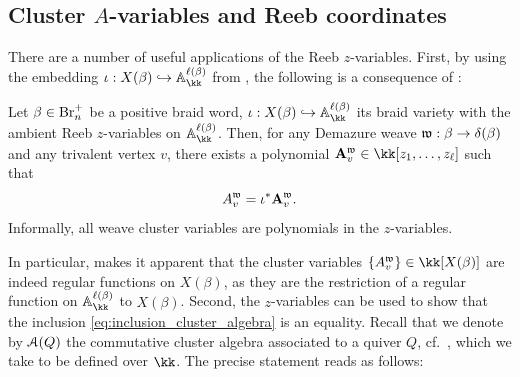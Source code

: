 \subsection{Cluster $A$-variables and Reeb coordinates}\label{ssec:polynomiality_A_variables_Reeb_coordinates}
There are a number of useful applications of the Reeb $z$-variables. First, by using the embedding $\iota:X(\beta)\hookrightarrow\mathbb{A}_\kk^{\ell(\beta)}$ from , the following is a consequence of \cite[Theorem 7.6]{CGGLSS25}:

\begin{theorem}\label{thm:polynomiality} Let $\beta\in\mbox{Br}_n^+$ be a positive braid word, $\iota:X(\beta)\hookrightarrow\mathbb{A}_\kk^{\ell(\beta)}$ its braid variety with the ambient Reeb $z$-variables on $\mathbb{A}_\kk^{\ell(\beta)}$. Then, for any Demazure weave $\mathfrak{w}:\beta\to\delta(\beta)$ and any trivalent vertex $v$, there exists a polynomial ${\bf A}^\w_v\in \kk[z_1,\ldots,z_\ell]$ such that
$$A^{\mathfrak{w}}_v=\iota^*{\bf A}^{\mathfrak{w}}_v.$$
Informally, all weave cluster variables are polynomials in the $z$-variables.\sbs
\end{theorem}

\noindent In particular,  makes it apparent that the cluster variables $\{A^\w_v\}\in\kk[X(\beta)]$ are indeed regular functions on $X(\beta)$, as they are the restriction of a regular function on $\mathbb{A}_\kk^{\ell(\beta)}$ to $X(\beta)$. Second, the $z$-variables can be used to show that the inclusion \eqref{eq:inclusion_cluster_algebra} is an equality. Recall that we denote by $\mathcal{A}(Q)$ the commutative cluster algebra associated to a quiver $Q$, cf.~\cite[Def.~3.1.9]{FWZ16}, which we take to be defined over $\kk$. The precise statement reads as follows:

